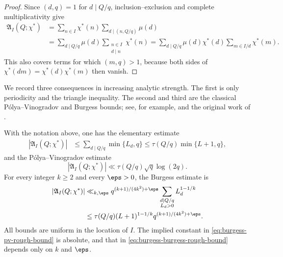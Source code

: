 \begin{proof}
Since $(d,q)=1$ for $d\mid Q/q$, inclusion--exclusion and complete
multiplicativity give
\begin{align*}
 \mathfrak A_I(Q;\chi^*)
 &=\sum_{n\in I}\chi^*(n)
   \sum_{d\mid(n,Q/q)}\mu(d)\\
 &=\sum_{d\mid Q/q}\mu(d)
   \sum_{\substack{n\in I\\d\mid n}}\chi^*(n)
 =\sum_{d\mid Q/q}\mu(d)\chi^*(d)
   \sum_{m\in I/d}\chi^*(m).
\end{align*}
This also covers terms for which $(m,q)>1$, because both sides of
$\chi^*(dm)=\chi^*(d)\chi^*(m)$ then vanish.
\end{proof}

We record three consequences in increasing analytic strength.  The first is
only periodicity and the triangle inequality.  The second and third are the
classical P\'olya--Vinogradov and Burgess bounds; see, for example,
\citet{MontgomeryVaughan2007} and the original work of
\citet{Burgess1962,Burgess1963II}.

\begin{proposition}
\label{prop:burgess-three-rough-bounds}
With the notation above, one has the elementary estimate
\begin{align}
 |\mathfrak A_I(Q;\chi^*)|
 &\le \sum_{d\mid Q/q}\min\{L_d,q\}
 \le \tau(Q/q)\min\{L+1,q\},
 \label{eq:burgess-elementary-rough-bound}
\end{align}
and the P\'olya--Vinogradov estimate
\begin{equation}\label{eq:burgess-pv-rough-bound}
 |\mathfrak A_I(Q;\chi^*)|
 \ll \tau(Q/q)\sqrt q\log(2q).
\end{equation}
For every integer $k\ge2$ and every $\eps>0$, the Burgess estimate is
\begin{align}
 |\mathfrak A_I(Q;\chi^*)|
 &\ll_{k,\eps}
 q^{(k+1)/(4k^2)+\eps}
 \sum_{\substack{d\mid Q/q\\L_d>0}}L_d^{1-1/k}
 \notag\\
 &\le
 \tau(Q/q)(L+1)^{1-1/k}
 q^{(k+1)/(4k^2)+\eps}.
 \label{eq:burgess-burgess-rough-bound}
\end{align}
All bounds are uniform in the location of $I$.  The implied constant in
\eqref{eq:burgess-pv-rough-bound} is absolute, and that in
\eqref{eq:burgess-burgess-rough-bound} depends only on $k$ and $\eps$.
\end{proposition}

